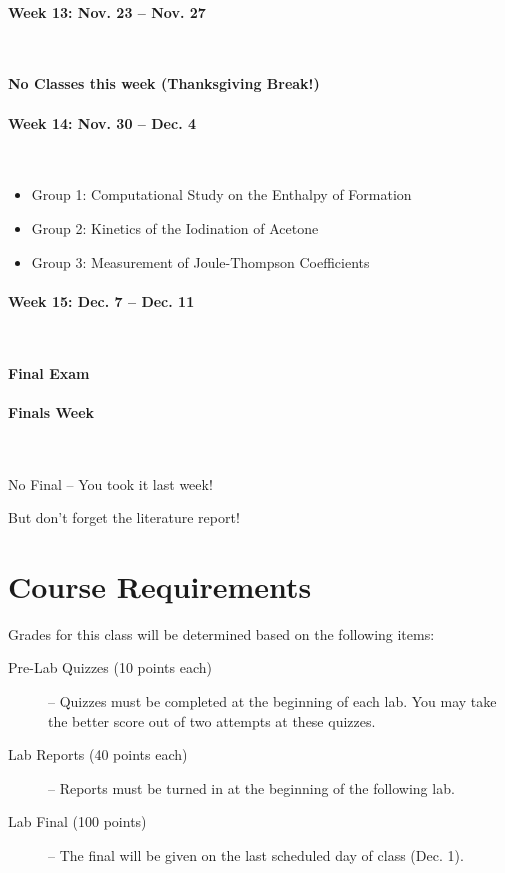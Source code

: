 \documentclass[12pt, letterpaper]{article}
\begin{document}
\paragraph{Week 13: Nov. 23 -- Nov. 27}~

\textbf{No Classes this week (Thanksgiving Break!)}

\paragraph{Week 14: Nov. 30 -- Dec. 4}~

\begin{itemize}
	\item Group 1: Computational Study on the Enthalpy of Formation
	\item Group 2: Kinetics of the Iodination of Acetone
	\item Group 3: Measurement of Joule-Thompson Coefficients
\end{itemize}


\paragraph{Week 15: Dec. 7 -- Dec. 11}~

\textbf{Final Exam}

\paragraph{Finals Week}~

No Final -- You took it last week!

But don't forget the literature report!

\section*{Course Requirements}
Grades for this class will be determined based on the following items:

\begin{description}
	\item[Pre-Lab Quizzes (10 points each)] -- Quizzes must be completed at the beginning of each lab. You may take the better score out of two attempts at these quizzes.
	\item[Lab Reports (40 points each)] -- Reports must be turned in at the beginning of the following lab.
	\item[Lab Final (100 points)] -- The final will be given on the last scheduled day of class (Dec. 1).
\end{description}
\end{document}
